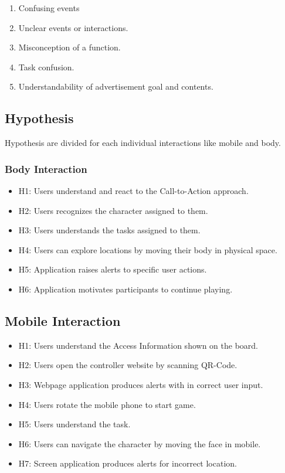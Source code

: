 \begin{enumerate}
\item   Confusing events
\item   Unclear events or interactions.
\item   Misconception of a function.
\item   Task confusion.
\item   Understandability of advertisement goal and contents.
\end{enumerate}


\subsection{Hypothesis}
Hypothesis are divided for each individual interactions like mobile and body.

\subsubsection{Body Interaction}

\begin{itemize}

\item H1: Users understand and react to the Call-to-Action approach.
\item H2: Users recognizes the character assigned to them.
\item H3: Users understands the tasks assigned to them.
\item H4: Users can explore locations by moving their body in physical space.
\item H5: Application raises alerts to specific user actions.
\item H6: Application motivates participants to continue playing.
\end{itemize}

\subsection{Mobile Interaction}

\begin{itemize}
\item H1: Users understand the Access Information shown on the board.
\item H2: Users open the controller website by scanning QR-Code.
\item H3: Webpage application produces alerts with in correct user input.
\item H4: Users rotate the mobile phone to start game.
\item H5: Users understand the task.
\item H6: Users can navigate the character by moving the face in mobile.
\item H7: Screen application produces alerts for incorrect location.
\end{itemize}

